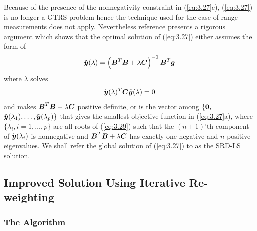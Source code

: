 Because of the presence of the nonnegativity constraint in (\ref{eq:3.27}c), (\ref{eq:3.27}) is no longer a GTRS problem hence the technique used for the case of range measurements does not apply. Nevertheless reference \cite{BeckStLi} presents a rigorous argument which shows that the optimal solution of (\ref{eq:3.27}) either assumes the form of
 \begin{equation}
 \nonumber
 \tilde{\mbox{\boldmath$y$}}(\lambda)=\left(\mbox{\boldmath$B$}^T\mbox{\boldmath$B$}+\lambda\mbox{\boldmath$C$}\right)^{-1}\mbox{\boldmath$B$}^T\mbox{\boldmath$g$}
 \end{equation}
 where $\lambda$ solves
 \begin{equation}\label{eq:3.29}
 \tilde{\mbox{\boldmath$y$}}(\lambda)^T\mbox{\boldmath$C$}\tilde{\mbox{\boldmath$y$}}(\lambda)=0
 \end{equation}
 and makes $\mbox{\boldmath$B$}^T\mbox{\boldmath$B$}+\lambda\mbox{\boldmath$C$}$ positive definite, or is the vector among $\{\mbox{\boldmath{$0$}},$ $\tilde{\mbox{\boldmath$y$}}(\lambda_1),\ldots,\tilde{\mbox{\boldmath$y$}}(\lambda_p)\}$ that gives the smallest objective function in (\ref{eq:3.27}a), where $\{\lambda_i, i = 1,\ldots,p\}$ are all roots of (\ref{eq:3.29}) such that the $(n+1)$'th component of $\tilde{\mbox{\boldmath$y$}}(\lambda_i)$ is nonnegative and $\mbox{\boldmath$B$}^T\mbox{\boldmath$B$}+\lambda\mbox{\boldmath$C$}$ has exactly one negative and $n$ positive eigenvalues. We shall refer the global solution of (\ref{eq:3.27}) to as the SRD-LS solution.

\subsection{Improved Solution Using Iterative Re-weighting} %
\subsubsection{The Algorithm} %

